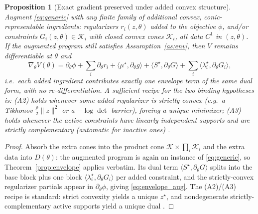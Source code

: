 \documentclass[twocolumn,amsthm]{autart}
\newtheorem{proposition}{Proposition}
\begin{document}
\begin{proposition}[Exact gradient preserved under added convex structure]\label{prop:regexact}
Augment \eqref{eq:generic} with any finite family of additional convex,
conic-representable ingredients: regularizers $r_i(z,\theta)$ added to the objective
$\phi$, and/or constraints $G_i(z,\theta)\in\mathcal{K}_i$ with closed convex cones
$\mathcal{K}_i$, all data $C^1$ in $(z,\theta)$. If the augmented program still
satisfies Assumption~\ref{as:env}, then $V$ remains differentiable at $\theta$ and
\begin{equation}\label{eq:envelope_aug}
\nabla_\theta V(\theta)=\partial_\theta\phi+\sum_i\partial_\theta r_i
+\langle\mu^\star,\partial_\theta g\rangle+\langle S^\star,\partial_\theta G\rangle
+\sum_i\langle\lambda_i^\star,\partial_\theta G_i\rangle,
\end{equation}
i.e.\ each added ingredient contributes exactly one envelope term of the same dual
form, with no re-differentiation. A sufficient recipe for the two binding hypotheses
is: \emph{(A2)} holds whenever some added regularizer is \emph{strictly convex}
(e.g.\ a Tikhonov $\tfrac{\rho}{2}\|z\|^2$ or a $-\log\det$ barrier), forcing a
unique minimizer; \emph{(A3)} holds whenever the active constraints have linearly
independent supports and are strictly complementary (automatic for inactive ones)
\cite{alizadeh1997complementarity,shapiro1997differentiability}.
\end{proposition}
\begin{proof}
Absorb the extra cones into the product cone
$\mathcal{K}\times\prod_i\mathcal{K}_i$ and the extra data into $D(\theta)$: the
augmented program is again an instance of \eqref{eq:generic}, so
Theorem~\ref{prop:envelope} applies verbatim. Its dual term
$\langle S^\star,\partial_\theta G\rangle$ splits into the base block plus one block
$\langle\lambda_i^\star,\partial_\theta G_i\rangle$ per added constraint, and the
strictly-convex regularizer partials appear in $\partial_\theta\phi$, giving
\eqref{eq:envelope_aug}. The (A2)/(A3) recipe is standard: strict convexity yields a
unique $z^\star$, and nondegenerate strictly-complementary active supports yield a
unique dual \cite{alizadeh1997complementarity,shapiro1997differentiability}.
\end{proof}
\end{document}
